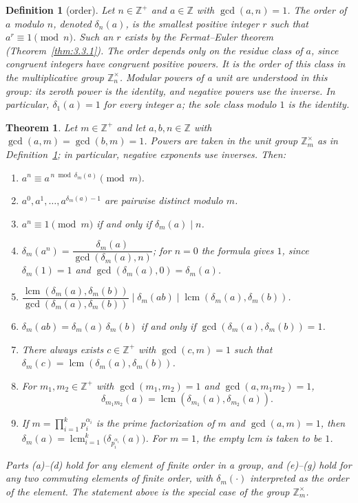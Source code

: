 \documentclass[11pt]{article}
\theoremstyle{ntstyle}
\newtheorem{theorem}{Theorem}[subsection]
\newtheorem{definition}{Definition}[subsection]
\newcommand{\ZmodUnits}[1]{\mathbb{Z}_{#1}^{\times}}
\DeclareMathOperator{\lcm}{lcm}
\begin{document}
\begin{definition}[order]\label{def:6.1.1} Let $n\in\mathbb{Z}^+$ and
	$a\in\mathbb{Z}$ with $\gcd(a,n)=1$. The order of $a$ modulo $n$,
	denoted $\delta_n(a)$, is the smallest positive integer $r$ such that
	$a^r\equiv1\pmod n$. Such an $r$ exists by the Fermat--Euler theorem
	(Theorem~\ref{thm:3.3.1}). The order depends only on the residue class of
	$a$, since congruent integers have congruent positive powers.
	It is the order of this class in the multiplicative group $\ZmodUnits{n}$.
	Modular powers of a unit are understood in this group: its zeroth power
	is the identity, and negative powers use the inverse. In particular,
	$\delta_1(a)=1$ for every integer $a$; the sole class modulo $1$ is the identity.

\end{definition}
\begin{theorem}\label{thm:6.1.1} Let $m\in\mathbb{Z}^+$ and let $a,b,n\in\mathbb{Z}$ with
	$\gcd(a,m)=\gcd(b,m)=1$. Powers are taken in the unit group
	$\ZmodUnits{m}$ as in Definition~\ref{def:6.1.1}; in particular,
	negative exponents use inverses. Then:

	\begin{enumerate}[label={\alph*)}]
		\item $a^{n} \equiv a^{\,n \bmod \delta_m(a)} \pmod{m}$.
		\item $a^{0}, a^{1}, \ldots, a^{\delta_m(a) - 1}$ are pairwise
		      distinct modulo $m$.
		\item $a^{n} \equiv 1 \pmod{m}$ if and only if $\delta_m(a) \mid n$.
		\item $\delta_m(a^{n}) = \dfrac{\delta_m(a)}{\gcd(\delta_m(a), n)}$; for $n=0$ the formula gives $1$, since $\delta_m(1)=1$ and $\gcd(\delta_m(a),0)=\delta_m(a)$.
		\item $\dfrac{\lcm(\delta_m(a), \delta_m(b))}{\gcd(\delta_m(a), \delta_m(b))} \mid \delta_m(ab) \mid
			      \lcm(\delta_m(a), \delta_m(b))$.
		\item $\delta_m(ab) = \delta_m(a)\,\delta_m(b)$ if and only if
		      $\gcd(\delta_m(a), \delta_m(b)) = 1$.
		\item There always exists $c \in \mathbb{Z}^+$ with $\gcd(c, m) =
			      1$ such that $\delta_m(c) = \lcm(\delta_m(a), \delta_m(b))$.
		\item For $m_1, m_2 \in \mathbb{Z}^+$ with $\gcd(m_1, m_2) = 1$
		      and $\gcd(a, m_1m_2) = 1$,
		      \[
			      \delta_{m_1m_2}(a)
			      =\lcm(\delta_{m_1}(a),\delta_{m_2}(a)).
		      \]
		\item If $m = \prod_{i=1}^{k} p_i^{\alpha_i}$ is the prime factorization
		      of $m$ and $\gcd(a,m)=1$, then
		      $\delta_m(a)=\lcm_{i=1}^{k}\big(\delta_{p_i^{\alpha_i}}(a)\big)$.
		      For $m=1$, the empty lcm is taken to be $1$.
	\end{enumerate}

	Parts (a)--(d) hold for any element of finite order in a group,
	and (e)--(g) hold for any two commuting elements of finite order, with
	$\delta_m(\cdot)$ interpreted as the order of the element. The statement above
	is the special case of the group $\ZmodUnits{m}$.

\end{theorem}
\end{document}
